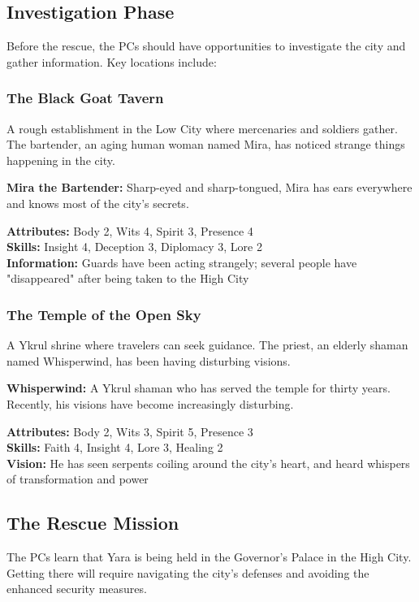 \documentclass[12pt,twoside]{article}
\begin{document}
\subsection{Investigation Phase}

Before the rescue, the PCs should have opportunities to investigate the city and gather information. Key locations include:

\subsubsection{The Black Goat Tavern}

A rough establishment in the Low City where mercenaries and soldiers gather. The bartender, an aging human woman named Mira, has noticed strange things happening in the city.

\textbf{Mira the Bartender:}
Sharp-eyed and sharp-tongued, Mira has ears everywhere and knows most of the city's secrets.

\textbf{Attributes:} Body 2, Wits 4, Spirit 3, Presence 4 \\
\textbf{Skills:} Insight 4, Deception 3, Diplomacy 3, Lore 2 \\
\textbf{Information:} Guards have been acting strangely; several people have "disappeared" after being taken to the High City

\subsubsection{The Temple of the Open Sky}

A Ykrul shrine where travelers can seek guidance. The priest, an elderly shaman named Whisperwind, has been having disturbing visions.

\textbf{Whisperwind:}
A Ykrul shaman who has served the temple for thirty years. Recently, his visions have become increasingly disturbing.

\textbf{Attributes:} Body 2, Wits 3, Spirit 5, Presence 3 \\
\textbf{Skills:} Faith 4, Insight 4, Lore 3, Healing 2 \\
\textbf{Vision:} He has seen serpents coiling around the city's heart, and heard whispers of transformation and power

\subsection{The Rescue Mission}

The PCs learn that Yara is being held in the Governor's Palace in the High City. Getting there will require navigating the city's defenses and avoiding the enhanced security measures.
\end{document}
